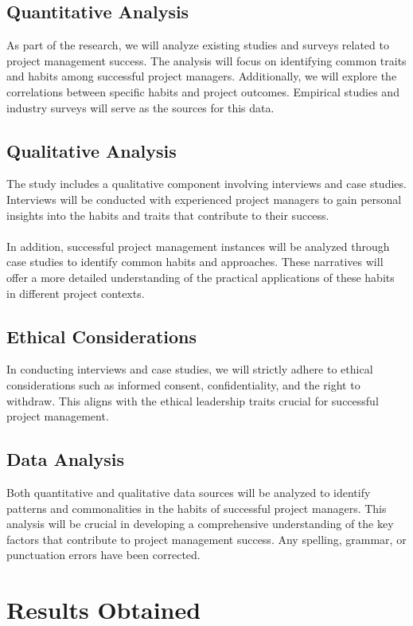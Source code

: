 \documentclass{article}
\begin{document}
\subsection{Quantitative Analysis}
As part of the research, we will analyze existing studies and surveys related to project management success. The analysis will focus on identifying common traits and habits among successful project managers. Additionally, we will explore the correlations between specific habits and project outcomes. Empirical studies and industry surveys will serve as the sources for this data.\cite{relationship_between_project_manage}
\subsection{Qualitative Analysis}
The study includes a qualitative component involving interviews and case studies. Interviews will be conducted with experienced project managers to gain personal insights into the habits and traits that contribute to their success. \\\\In addition, successful project management instances will be analyzed through case studies to identify common habits and approaches. These narratives will offer a more detailed understanding of the practical applications of these habits in different project contexts\cite{Project_Management}.
\subsection{Ethical Considerations}
In conducting interviews and case studies, we will strictly adhere to ethical considerations such as informed consent, confidentiality, and the right to withdraw. This aligns with the ethical leadership traits crucial for successful project management\cite{Project_Management_Techniques}.
\subsection{Data Analysis}
Both quantitative and qualitative data sources will be analyzed to identify patterns and commonalities in the habits of successful project managers. This analysis will be crucial in developing a comprehensive understanding of the key factors that contribute to project management success. Any spelling, grammar, or punctuation errors have been corrected.


\newpage
\section{Results Obtained}
\end{document}

